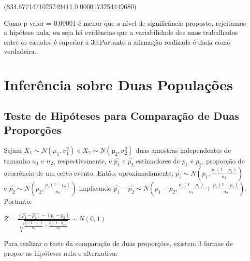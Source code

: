 \documentclass[
  letterpaper,
  DIV=11,
  numbers=noendperiod]{scrreprt}
\begin{document}
\begin{tcolorbox}[enhanced jigsaw, breakable, leftrule=.75mm, left=2mm, opacityback=0, bottomrule=.15mm, toprule=.15mm, rightrule=.15mm, arc=.35mm, colback=white]

(834.6771471025249411,0.0000173254449680)

\end{tcolorbox}

Como p-valor = 0.00001 é menor que o nível de significância proposto,
rejeitamos a hipótese nula, ou seja há evidências que a variabilidade
dos anos trabalhados entre os casados é superior a 30.Portanto a
afirmação realizada é dada como verdadeira.


\hypertarget{inferuxeancia-sobre-duas-populauxe7uxf5es}{%
\chapter{Inferência sobre Duas
Populações}\label{inferuxeancia-sobre-duas-populauxe7uxf5es}}

\hypertarget{teste-de-hipuxf3teses-para-comparauxe7uxe3o-de-duas-proporuxe7uxf5es}{%
\section{Teste de Hipóteses para Comparação de Duas
Proporções}\label{teste-de-hipuxf3teses-para-comparauxe7uxe3o-de-duas-proporuxe7uxf5es}}

Sejam \({X_{1} \sim N(\mu_{1}, \sigma^2_{1})}\) e
\({X_{2} \sim N(µ_{2}, σ^2_{2})}\) duas amostras independentes de
tamanho \({n_{1}}\) e \({n_{2}}\), respectivamente, e
\({ \hat{p_{1}} }\) e \({ \hat{p_{2}} }\) estimadores de \({p_{1}}\) e
\({p_{2}}\), proporção de ocorrência de um certo evento. Então,
aproximadamente,
\({\hat{p_{1}} \sim N\left ( p_{1}, \frac{p_{1}(1 - p_{1})}{n_{1}} \right )}\)
e
\({\hat{p_{2}} \sim N\left ( p_{2}, \frac{p_{2}(1 - p_{2})}{n_{2}} \right )}\)
implicando
\({\hat{p_{1}} - \hat{p_{2}} \sim N\left ( p_{1} - p_{2}, \frac{p_{1}(1 - p_{1})}{n_{1}}+ \frac{p_{2}(1 - p_{2})}{n_{2}} \right )}\).
Portanto:

\(Z = \frac{(\hat{p_{1}} - \hat{p_{2}}) - (p_{1} - p_{2})}{\sqrt{\frac{\hat{p_{1}}(1 - \hat{p_{1}})}{n_{1}} + \frac{\hat{p_{2}}(1 - \hat{p_{2}})}{n_{2}}}} \sim N(0, 1)\)

Para realizar o teste da comparação de duas proporções, existem 3 formas
de propor as hipóteses nula e alternativa:
\end{document}
